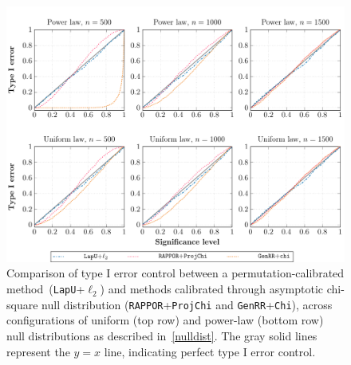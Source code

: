 \documentclass[twoside,11pt]{article}
\begin{document}
\begin{figure}[t!]
	\centering
	\includegraphics[width=0.95\linewidth]{typeone.pdf}
	\caption{Comparison of type I error control between a permutation-calibrated method~(\texttt{LapU}+$\ell_2$) and methods calibrated through asymptotic chi-square null distribution (\texttt{RAPPOR}+\texttt{ProjChi} and \texttt{GenRR}+\texttt{Chi}),
		across configurations of uniform (top row) and power-law (bottom row) null distributions as described in~\eqref{nulldist}. The gray solid lines represent the $y=x$ line, indicating perfect type I error control.
	}
	\label{fig:typeone}
\end{figure}
\end{document}
